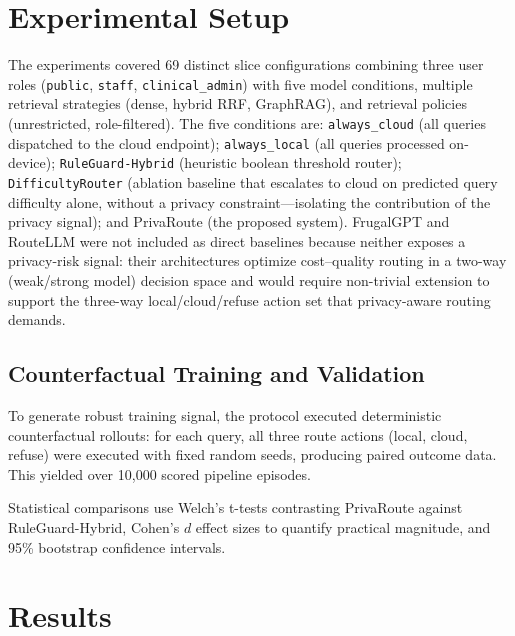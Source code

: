 \documentclass{article}
\newcommand{\code}[1]{{\small\texttt{#1}}}
\begin{document}
\section{Experimental Setup}

The experiments covered 69 distinct slice configurations combining three user roles (\code{public}, \code{staff}, \code{clinical\_admin}) with five model conditions, multiple retrieval strategies (dense, hybrid RRF, GraphRAG), and retrieval policies (unrestricted, role-filtered). The five conditions are: \code{always\_cloud} (all queries dispatched to the cloud endpoint); \code{always\_local} (all queries processed on-device); \code{RuleGuard-Hybrid} (heuristic boolean threshold router); \code{DifficultyRouter} (ablation baseline that escalates to cloud on predicted query difficulty alone, without a privacy constraint---isolating the contribution of the privacy signal); and PrivaRoute (the proposed system). FrugalGPT \cite{chen2023frugalgpt} and RouteLLM \cite{routellm2024} were not included as direct baselines because neither exposes a privacy-risk signal: their architectures optimize cost--quality routing in a two-way (weak/strong model) decision space and would require non-trivial extension to support the three-way local/cloud/refuse action set that privacy-aware routing demands.

\subsection{Counterfactual Training and Validation}
To generate robust training signal, the protocol executed deterministic counterfactual rollouts: for each query, all three route actions (local, cloud, refuse) were executed with fixed random seeds, producing paired outcome data. This yielded over 10,000 scored pipeline episodes.

Statistical comparisons use Welch's t-tests contrasting PrivaRoute against RuleGuard-Hybrid, Cohen's $d$ effect sizes to quantify practical magnitude, and 95\% bootstrap confidence intervals.

\section{Results}

\end{document}
